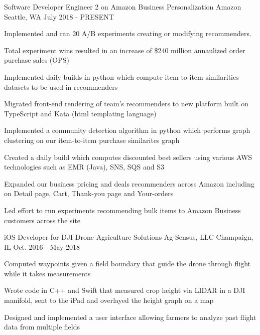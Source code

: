 

\begin{cventries}

  \cventry
    {Software Developer Engineer 2 on Amazon Business Personalization} %
    {Amazon} %
    {Seattle, WA} %
    {July 2018 - PRESENT} %
    {
      \begin{cvitems} %
        \item {Implemented and ran 20 A/B experiments creating or modifying recommenders.}
        \item {Total experiment wins resulted in an increase of \$240 million annaulized order purchase sales (OPS)}
        \item {Implemented daily builds in python which compute item-to-item similarities datasets to be used in recommenders}
        \item {Migrated front-end rendering of team's recommenders to new platform built on TypeScript and Kata (html templating language)}
        \item {Implemented a community detection algorithm in python which performs graph clustering on our item-to-item purchase similarites graph}
        \item {Created a daily build which computes discounted best sellers using various AWS technologies such as EMR (Java), SNS, SQS and S3}
        \item {Expanded our business pricing and deals recommenders across Amazon including on Detail page, Cart, Thank-you page and Your-orders}
        \item {Led effort to run experiments recommending bulk items to Amazon Business customers across the site}
      \end{cvitems}
    }

  \cventry
    {iOS Developer for DJI Drone Agriculture Solutions} %
    {Ag-Sensus, LLC} %
    {Champaign, IL} %
    {Oct. 2016 - May 2018} %
    {
      \begin{cvitems} %
        \item {Computed waypoints given a field boundary that guide the drone through flight while it takes measurements}
        \item {Wrote code in C++ and Swift that measured crop height via LIDAR in a DJI manifold, sent to the iPad and overlayed the height graph on a map}
        \item {Designed and implemented a user interface allowing farmers to analyze past flight data from multiple fields}
      \end{cvitems}
    }


\end{cventries}
